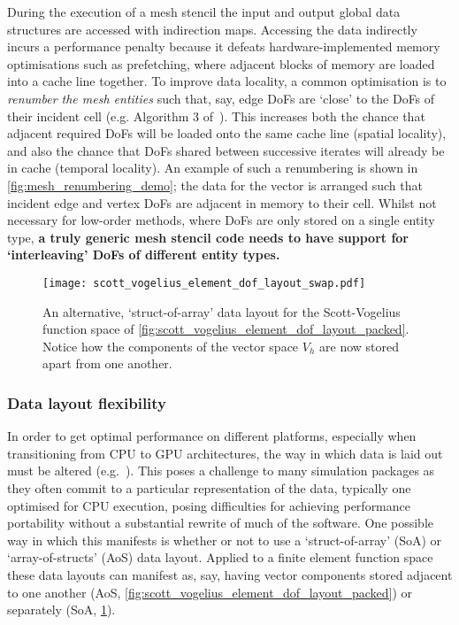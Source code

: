\documentclass[thesis]{subfiles}
\begin{document}
During the execution of a mesh stencil the input and output global data structures are accessed with indirection maps.
Accessing the data indirectly incurs a performance penalty because it defeats hardware-implemented memory optimisations such as prefetching, where adjacent blocks of memory are loaded into a cache line together.
To improve data locality, a common optimisation is to \textit{renumber the mesh entities} such that, say, edge DoFs are `close' to the DoFs of their incident cell (e.g. Algorithm 3 of~\cite{langeEfficientMeshManagement2016}).
This increases both the chance that adjacent required DoFs will be loaded onto the same cache line (spatial locality), and also the chance that DoFs shared between successive iterates will already be in cache (temporal locality).
An example of such a renumbering is shown in \cref{fig:mesh_renumbering_demo}; the data for the vector is arranged such that incident edge and vertex DoFs are adjacent in memory to their cell.
Whilst not necessary for low-order methods, where DoFs are only stored on a single entity type, \textbf{a truly generic mesh stencil code needs to have support for `interleaving' DoFs of different entity types.}

\begin{figure}
  \centering
  \texttt{[image: scott\_vogelius\_element\_dof\_layout\_swap.pdf]}
  \caption{
    An alternative, `struct-of-array' data layout for the Scott-Vogelius function space of \cref{fig:scott_vogelius_element_dof_layout_packed}.
    Notice how the components of the vector space $V_h$ are now stored apart from one another.
  }
  \label{fig:scott_vogelius_element_dof_layout_swap}
\end{figure}

\subsubsection{Data layout flexibility}
\label{sec:intro_data_layout_flex}

In order to get optimal performance on different platforms, especially when transitioning from CPU to GPU architectures, the way in which data is laid out must be altered (e.g.~\cite{markallFiniteElementAssembly2013,sulyokImprovingLocalityUnstructured2018}).
This poses a challenge to many simulation packages as they often commit to a particular representation of the data, typically one optimised for CPU execution, posing difficulties for achieving performance portability without a substantial rewrite of much of the software.
One possible way in which this manifests is whether or not to use a `struct-of-array' (SoA) or `array-of-structs' (AoS) data layout.
Applied to a finite element function space these data layouts can manifest as, say, having vector components stored adjacent to one another (AoS, \cref{fig:scott_vogelius_element_dof_layout_packed}) or separately (SoA, \cref{fig:scott_vogelius_element_dof_layout_swap}).
\end{document}
